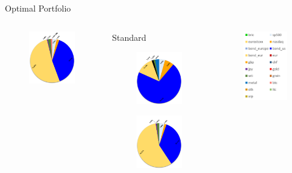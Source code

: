 \documentclass[aspectratio=169]{beamer}
\newcommand\Fontvi{\fontsize{8}{7.2}\selectfont}
\begin{document}
\begin{frame}{Optimal Portfolio}
\begin{columns}
\begin{column}{0.25\textwidth}
\begin{figure}
            \end{figure}
            \begin{figure}
                \centering
                \includegraphics[width=2.3cm]{Images/torte/torta_half_btc.png}
            \end{figure}
		\end{column}
    	\begin{column}{0.25\textwidth} 
    	    \begin{center}
            \Fontvi{}Standard
            \end{center}
            \begin{figure}
                \centering
                \includegraphics[width=2.3cm]{Images/torte/torta_whole_no.png}
            \end{figure}
            \begin{figure}
                \centering
                \includegraphics[width=2.3cm]{Images/torte/torta_half_no.png}
            \end{figure}
		\end{column}
		\begin{column}{0.15\textwidth}
            \begin{figure}
                \centering
                \includegraphics[width=2.2cm]{Images/legend.PNG}
            \end{figure}
		\end{column}
	\end{columns}
\end{frame}
\end{document}
